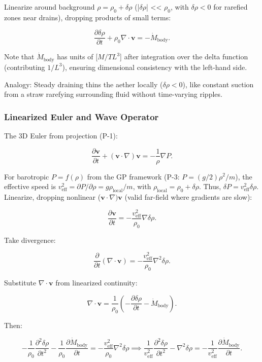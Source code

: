 \documentclass{article}
\begin{document}
Linearize around background $\rho = \rho_0 + \delta \rho$ (|$ \delta \rho $| << $\rho_0$, with $\delta \rho < 0$ for rarefied zones near drains), dropping products of small terms:

\[
\frac{\partial \delta \rho}{\partial t} + \rho_0 \nabla \cdot \mathbf{v} = -\dot{M}_{\text{body}}.
\]

Note that $\dot{M}_{\text{body}}$ has units of [$M/T L^3$] after integration over the delta function (contributing $1/L^3$), ensuring dimensional consistency with the left-hand side.

Analogy: Steady draining thins the aether locally ($\delta \rho < 0$), like constant suction from a straw rarefying surrounding fluid without time-varying ripples.

\subsubsection{Linearized Euler and Wave Operator}

The 3D Euler from projection (P-1):

\[
\frac{\partial \mathbf{v}}{\partial t} + (\mathbf{v} \cdot \nabla) \mathbf{v} = -\frac{1}{\rho} \nabla P.
\]

For barotropic $P = f(\rho)$ from the GP framework (P-3: $P = (g/2) \rho^2 / m$), the effective speed is $v_{\text{eff}}^2 = \partial P / \partial \rho = g \rho_{\text{local}} / m$, with $\rho_{\text{local}} = \rho_0 + \delta \rho$. Thus, $\delta P = v_{\text{eff}}^2 \delta \rho$. Linearize, dropping nonlinear ($\mathbf{v} \cdot \nabla) \mathbf{v}$ (valid far-field where gradients are slow):

\[
\frac{\partial \mathbf{v}}{\partial t} = -\frac{v_{\text{eff}}^2}{\rho_0} \nabla \delta \rho.
\]

Take divergence:

\[
\frac{\partial}{\partial t} (\nabla \cdot \mathbf{v}) = -\frac{v_{\text{eff}}^2}{\rho_0} \nabla^2 \delta \rho.
\]

Substitute $\nabla \cdot \mathbf{v}$ from linearized continuity:

\[
\nabla \cdot \mathbf{v} = \frac{1}{\rho_0} \left( -\frac{\partial \delta \rho}{\partial t} - \dot{M}_{\text{body}} \right).
\]

Then:

\[
-\frac{1}{\rho_0} \frac{\partial^2 \delta \rho}{\partial t^2} - \frac{1}{\rho_0} \frac{\partial \dot{M}_{\text{body}}}{\partial t} = -\frac{v_{\text{eff}}^2}{\rho_0} \nabla^2 \delta \rho \implies \frac{1}{v_{\text{eff}}^2} \frac{\partial^2 \delta \rho}{\partial t^2} - \nabla^2 \delta \rho = -\frac{1}{v_{\text{eff}}^2} \frac{\partial \dot{M}_{\text{body}}}{\partial t}.
\]
\end{document}
